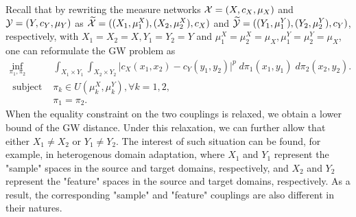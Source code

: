 Recall that by rewriting the measure networks $\mathcal X = (X, c_X, \mu_X)$ and $\mathcal Y = (Y, c_Y, \mu_Y)$ as
$\widetilde{\mathcal X} = ((X_1, \mu_1^X), (X_2, \mu_2^X), c_X)$ and
$\widetilde{\mathcal Y} = ((Y_1, \mu_1^Y), (Y_2, \mu_2^Y), c_Y)$, respectively, with
$X_1 = X_2 = X, Y_1 = Y_2 = Y$ and
$\mu_1^X = \mu^X_2 = \mu_X, \mu_1^Y = \mu^Y_2 = \mu_X$, one can reformulate the GW problem as
\begin{equation}
  \begin{split}
    \inf_{\pi_1, \pi_2}
    &\int_{X_1 \times Y_1} \int_{X_2 \times Y_2}
    \big\vert c_X(x_1, x_2) - c_Y(y_1, y_2) \big\vert^p \; d\pi_1(x_1, y_1) \; d\pi_2(x_2, y_2). \\
    \text{ subject to: } &\pi_k \in U(\mu_k^X, \mu_k^Y), \forall k = 1,2, \\
    &\pi_1 = \pi_2.
  \end{split}
\end{equation}
When the equality constraint on the two couplings is relaxed,
we obtain a lower bound of the GW distance. Under this relaxation,
we can further allow that either $X_1 \neq X_2$ or $Y_1 \neq Y_2$.
The interest of such situation can be found, for example, in heterogenous domain adaptation,
where $X_1$ and $Y_1$ represent the "sample" spaces in the source and target domains, respectively,
and $X_2$ and $Y_2$ represent the "feature" spaces in the source and target domains, respectively.
As a result, the corresponding "sample" and "feature" couplings are also different in their natures.

